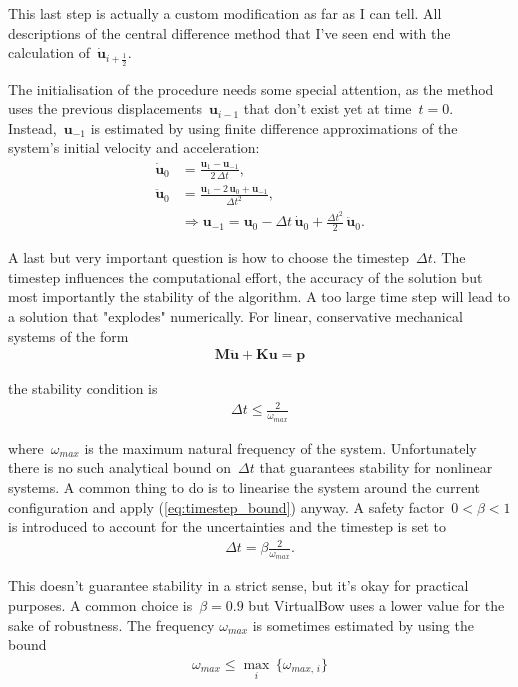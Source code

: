 This last step is actually a custom modification as far as I can tell.
All descriptions of the central difference method that I've seen end with the calculation of~$\dot{\boldsymbol{u}}_{i+\frac{1}{2}}$.

The initialisation of the procedure needs some special attention, as the method uses the previous displacements~$\boldsymbol{u}_{i-1}$ that don't exist yet at time~$t = 0$.
Instead,~$\boldsymbol{u}_{-1}$ is estimated by using finite difference approximations of the system's initial velocity and acceleration:
%
\begin{align}
\dot{\boldsymbol{u}}_0 &= \frac{\boldsymbol{u}_{1} - \boldsymbol{u}_{-1}}{2\,\Delta t},\\
\ddot{\boldsymbol{u}}_0 &= \frac{\boldsymbol{u}_{1} - 2\,\boldsymbol{u}_{0} + \boldsymbol{u}_{-1}}{\Delta t^2},\\
&\Rightarrow \boldsymbol{u}_{-1} = \boldsymbol{u}_{0} - \Delta t\,\dot{\boldsymbol{u}}_{0} + \frac{\Delta t^2}{2}\,\ddot{\boldsymbol{u}}_{0}.
\end{align}

A last but very important question is how to choose the timestep~$\Delta t$.
The timestep influences the computational effort, the accuracy of the solution but most importantly the stability of the algorithm.
A too large time step will lead to a solution that "explodes" numerically.
For linear, conservative mechanical systems of the form
%
\begin{align}
\boldsymbol{M}\ddot{\boldsymbol{u}} + \boldsymbol{K}\boldsymbol{u} = \boldsymbol{p}
\end{align}

the stability condition is
%
\begin{align}
\Delta t \le \frac{2}{\omega_{max}}\label{eq:timestep_bound}
\end{align}

where~$\omega_{max}$ is the maximum natural frequency \cite{bib:dynamic_solution} of the system.
Unfortunately there is no such analytical bound on~$\Delta t$ that guarantees stability for nonlinear systems.
A common thing to do is to linearise the system around the current configuration and apply (\ref{eq:timestep_bound}) anyway.
A safety factor~$0 < \beta < 1$ is introduced to account for the uncertainties and the timestep is set to
%
\begin{align}
\Delta t = \beta \frac{2}{\omega_{max}}.
\end{align}

This doesn't guarantee stability in a strict sense, but it's okay for practical purposes. A common choice is~$\beta = 0.9$ but VirtualBow uses a lower value for the sake of robustness. The frequency $\omega_{max}$ is sometimes estimated by using the bound
%
\begin{align}
\omega_{max} \le \max_{i}\,\{\omega_{max,\,i}\}
\end{align}

